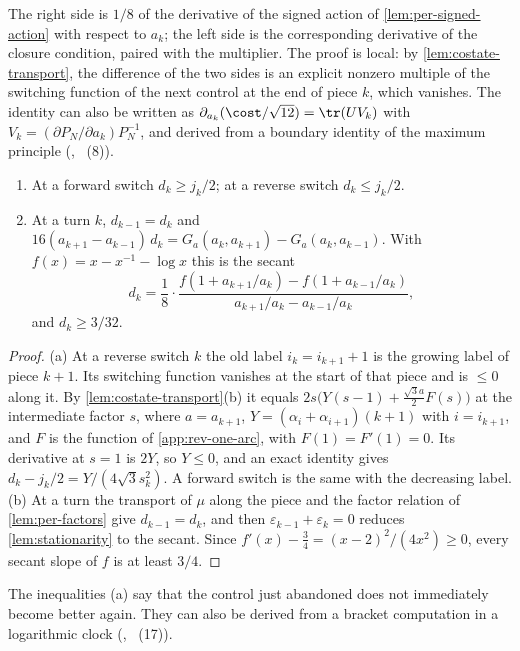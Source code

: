 The right side is $1/8$ of the derivative of the signed action of \cref{lem:per-signed-action}
with respect to $a_k$; the left side is the corresponding derivative of the closure condition,
paired with the multiplier. The proof is local: by \cref{lem:costate-transport}, the
difference of the two sides is an explicit nonzero multiple of the switching function of the
next control at the end of piece $k$, which vanishes. The identity can also be written as
$\partial_{a_k}(\cost/\sqrt{12})=\tr(UV_k)$ with $V_k=(\partial P_N/\partial a_k)P_N^{-1}$, and
derived from a boundary identity of the maximum principle (\cite{Notes},
~(8)).

\begin{lemma}\label{lem:switch-norms}
\begin{enumerate}[label=\textup{(\alph*)}]
\item At a forward switch $d_k\ge j_k/2$; at a reverse switch $d_k\le j_k/2$.
\item At a turn $k$, $d_{k-1}=d_k$ and $16(a_{k+1}-a_{k-1})\,d_k=G_a(a_k,a_{k+1})-G_a(a_k,a_{k-1})$.
  With $f(x)=x-x^{-1}-\log x$ this is the secant
  \[
    d_k=\frac18\cdot\frac{f(1+a_{k+1}/a_k)-f(1+a_{k-1}/a_k)}{a_{k+1}/a_k-a_{k-1}/a_k},
  \]
  and $d_k\ge3/32$.
\end{enumerate}
\end{lemma}

\begin{proof}
(a) At a reverse switch $k$ the old label $i_k=i_{k+1}+1$ is the growing label of piece $k+1$.
Its switching function vanishes at the start of that piece and is $\le0$ along it. By
\cref{lem:costate-transport}(b) it equals $2s\bigl(Y(s-1)+\frac{\sqrt3a}{2}F(s)\bigr)$ at the
intermediate factor $s$, where $a=a_{k+1}$, $Y=(\alpha_i+\alpha_{i+1})(k+1)$ with $i=i_{k+1}$,
and $F$ is the function of \cref{app:rev-one-arc}, with $F(1)=F'(1)=0$. Its derivative at $s=1$ is
$2Y$, so $Y\le0$, and an exact identity gives
$d_k-j_k/2=Y/(4\sqrt3s_k^2)$. A forward switch is the same
with the decreasing label. (b) At a turn the transport of $\mu$ along the
piece and the factor relation of \cref{lem:per-factors} give $d_{k-1}=d_k$, and then $\varepsilon_{k-1}+\varepsilon_k=0$ reduces \cref{lem:stationarity}
to the secant. Since $f'(x)-\frac34=(x-2)^2/(4x^2)\ge0$, every secant slope of $f$ is at least
$3/4$.
\end{proof}

The inequalities (a) say that the control just abandoned does not immediately become better
again. They can also be derived from a bracket computation in a logarithmic clock
(\cite{Notes}, ~(17)).

